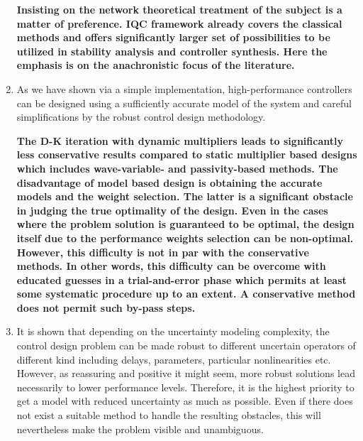 \begin{enumerate}
    {\bfseries Insisting on the network theoretical treatment of the subject is a matter of preference. IQC framework already covers the 
    classical methods and offers significantly larger set of possibilities to be utilized in stability analysis and controller synthesis. Here 
    the emphasis is on the anachronistic focus of the literature. 
    }
    \item As we have shown via a simple implementation, high-performance controllers can be designed using a sufficiently accurate model of
    the system and careful simplifications by the robust control design methodology. 
    
    {\bfseries The D-K iteration with dynamic multipliers leads to significantly less conservative results compared to static multiplier 
    based designs which includes wave-variable- and passivity-based methods. The disadvantage of model based design is obtaining the accurate
    models and the weight selection. The latter is a significant obstacle in judging the true optimality of the design. Even in the cases 
    where the problem solution is guaranteed to be optimal, the design itself due to the performance weights selection can be non-optimal. 
    However, this difficulty is not in par with the conservative methods. In other words, this difficulty can be overcome with educated 
    guesses in a trial-and-error phase which permits at least some systematic procedure up to an extent. A conservative method does not 
    permit such by-pass steps.
    }
    \item It is shown that depending on the uncertainty modeling complexity, the control design problem can be made robust to different 
    uncertain operators of different kind including delays, parameters, particular nonlinearities etc. However, as reassuring and positive 
    it might seem, more robust solutions lead necessarily to lower performance levels. Therefore, it is the highest priority to get a 
    model with reduced uncertainty as much as possible. Even if there does not exist a suitable method to handle the resulting obstacles, 
    this will nevertheless make the problem visible and unambiguous. 
    

\end{enumerate}
